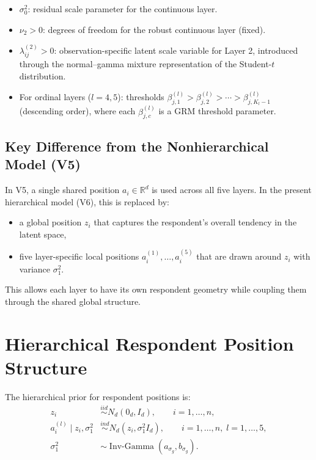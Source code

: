 \documentclass[11pt]{article}
\begin{document}
\begin{itemize}[leftmargin=1.5em]
    \item $\sigma_0^2$: residual scale parameter for the continuous layer.
    \item $\nu_2 > 0$: degrees of freedom for the robust continuous layer (fixed).
    \item $\lambda_{ij}^{(2)} > 0$: observation-specific latent scale variable for Layer 2, introduced through the normal--gamma mixture representation of the Student-$t$ distribution.
    \item For ordinal layers ($l=4,5$): thresholds $\beta_{j,1}^{(l)} > \beta_{j,2}^{(l)} > \cdots > \beta_{j,K_l-1}^{(l)}$ (descending order), where each $\beta_{j,c}^{(l)}$ is a GRM threshold parameter.
\end{itemize}

\subsection*{Key Difference from the Nonhierarchical Model (V5)}

In V5, a single shared position $a_i \in \mathbb{R}^d$ is used across all five layers. In the present hierarchical model (V6), this is replaced by:
\begin{itemize}[leftmargin=1.5em]
    \item a global position $z_i$ that captures the respondent's overall tendency in the latent space,
    \item five layer-specific local positions $a_i^{(1)},\dots,a_i^{(5)}$ that are drawn around $z_i$ with variance $\sigma_1^2$.
\end{itemize}
This allows each layer to have its own respondent geometry while coupling them through the shared global structure.

\section{Hierarchical Respondent Position Structure}

The hierarchical prior for respondent positions is:
\begin{align}
z_i &\overset{iid}{\sim} N_d(0_d, I_d), \qquad i=1,\dots,n, \label{eq:z-prior}\\
a_i^{(l)} \mid z_i, \sigma_1^2 &\overset{ind}{\sim} N_d(z_i, \sigma_1^2 I_d), \qquad i=1,\dots,n,\; l=1,\dots,5, \label{eq:a-prior}\\
\sigma_1^2 &\sim \operatorname{Inv\text{-}Gamma}(a_{\sigma_g}, b_{\sigma_g}). \label{eq:sig1-prior}
\end{align}
\end{document}
